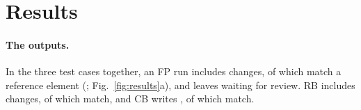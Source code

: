 \section{Results}\label{sec:results}

\paragraph{The outputs.} In the three test cases together, an FP run includes  changes, of %
which  match a reference element (; Fig.~\ref{fig:results}a), and
leaves  waiting for review. RB includes  changes, of
which  match, and CB writes , of which  match.

